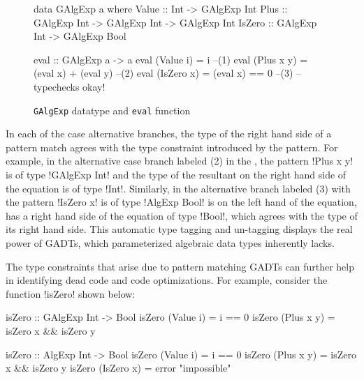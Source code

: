\documentclass[screen,nonacm,manuscript,review]{acmart} %
\begin{document}
\begin{figure}[ht]
\centering
\begin{minipage}[ht]{0.6\linewidth}
\begin{CenteredBox}
\begin{code}
data GAlgExp a where
  Value  :: Int                        -> GAlgExp Int
  Plus   :: GAlgExp Int -> GAlgExp Int -> GAlgExp Int
  IsZero :: GAlgExp Int                -> GAlgExp Bool
\end{code}
\end{CenteredBox}
\end{minipage}%
\begin{minipage}[ht]{0.4\linewidth}
\begin{CenteredBox}
\begin{code}
eval :: GAlgExp a -> a
eval (Value i) = i                    --(1)
eval (Plus x y) = (eval x) + (eval y) --(2)
eval (IsZero x) = (eval x) == 0       --(3)
                   -- typechecks okay!
\end{code}
\end{CenteredBox}
\end{minipage}%
\caption{\texttt{GAlgExp} datatype and \texttt{eval} function}
\label{fig:galgexp-eval}
\end{figure}

In each of the case alternative branches, the type of the right hand side of a
pattern match agrees with the type constraint introduced by the
pattern. For example, in the alternative case branch labeled (2)
in the , the
pattern !Plus x y! is of type !GAlgExp Int! and the type of the
resultant on the right hand side of the equation is of type !Int!.
Similarly, in the alternative branch labeled (3) with the pattern
!IsZero x! is of type !AlgExp Bool! is on the left hand of the
equation, has a right hand side of the equation
of type !Bool!, which agrees with the type of its right hand side.
This automatic type tagging and un-tagging displays the real power
of GADTs, which parameterized algebraic data types inherently lacks.

The type constraints that arise due to pattern matching GADTs can
further help in identifying dead code and code
optimizations\cite{xi_dead_1998,graf_lower_2020,nilsson_dynamic_2005}.
For example, consider the function !isZero! shown below:

\begin{minipage}[ht]{0.5\linewidth}
\begin{CenteredBox}
\begin{code}
isZero :: GAlgExp Int -> Bool
isZero (Value i) = i == 0
isZero (Plus x y) = isZero x && isZero y
\end{code}
\end{CenteredBox}
\end{minipage}%
\begin{minipage}{0.5\linewidth}
\begin{CenteredBox}
\begin{code}
isZero :: AlgExp Int -> Bool
isZero (Value i) = i == 0
isZero (Plus x y) = isZero x && isZero y
isZero (IsZero x) = error "impossible"
\end{code}
\end{CenteredBox}
\end{minipage}
\end{document}
